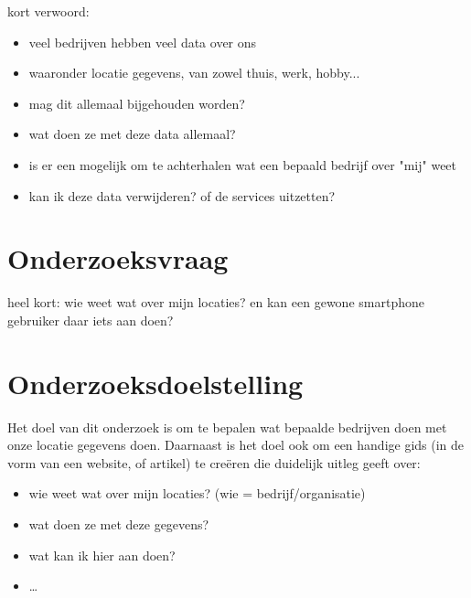 kort verwoord:
\begin{itemize}
\item veel bedrijven hebben veel data over ons
\item waaronder locatie gegevens, van zowel thuis, werk, hobby...
\item mag dit allemaal bijgehouden worden?
\item wat doen ze met deze data allemaal?
\item is er een mogelijk om te achterhalen wat een bepaald bedrijf over "mij" weet
\item kan ik deze data verwijderen? of de services uitzetten?

\end{itemize}

\section{Onderzoeksvraag}
\label{sec:onderzoeksvraag}

\iffalse
Wees zo concreet mogelijk bij het formuleren van je onderzoeksvraag. Een onderzoeksvraag is trouwens iets waar nog niemand op dit moment een antwoord heeft (voor zover je kan nagaan). Het opzoeken van bestaande informatie (bv. ``welke tools bestaan er voor deze toepassing?'') is dus geen onderzoeksvraag. Je kan de onderzoeksvraag verder specifiëren in deelvragen. Bv.~als je onderzoek gaat over performantiemetingen, dan 
\fi

heel kort: wie weet wat over mijn locaties? en kan een gewone smartphone gebruiker daar iets aan doen?


\section{Onderzoeksdoelstelling}
\label{sec:onderzoeksdoelstelling}

\iffalse
Wat is het beoogde resultaat van je bachelorproef? Wat zijn de criteria voor succes? Beschrijf die zo concreet mogelijk.
\fi

Het doel van dit onderzoek is om te bepalen wat bepaalde bedrijven doen met onze locatie gegevens doen.
Daarnaast is het doel ook om een handige gids (in de vorm van een website, of artikel) te creëren die duidelijk uitleg geeft over:
\begin{itemize}
  \item wie weet wat over mijn locaties? (wie = bedrijf/organisatie)
  \item wat doen ze met deze gegevens?
  \item wat kan ik hier aan doen?
  \item \ldots
\end{itemize}


